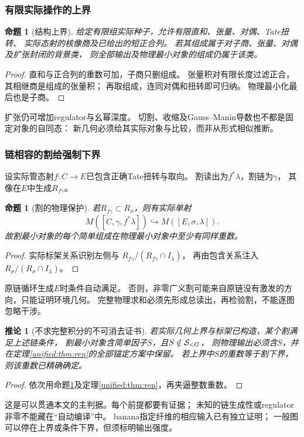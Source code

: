 \documentclass[11pt,a4paper,oneside]{ctexart}
\theoremstyle{cnplain}
\newtheorem{proposition}[theorem]{命题}
\newtheorem{corollary}[theorem]{推论}
\theoremstyle{definition}
\theoremstyle{remark}
\numberwithin{equation}{section}
\begin{document}
\subsubsection{有限实际操作的上界}
\begin{proposition}[结构上界]\label{unified:prop:upper}
给定有限组实际种子，允许有限直和、张量、对偶、Tate扭转、
实际态射的核像商及已给出的短正合列。
若其组成属于对子商、张量、对偶及扩张封闭的背景类，
则全部输出及物理最小对象的组成仍属于该类。
\end{proposition}
\begin{proof}
直和与正合列的重数可加，子商只删组成。
张量积对有限长度过滤正合，其相继商是组成的张量积；
再取组成，连同对偶和扭转即可归纳。
物理最小化最后也是子商。
\end{proof}
扩张仍可增加regulator与幺幂深度。
切割、收缩及Gauss--Manin导数也不都是固定对象的自同态：
新几何必须给其实际对象与比较，而非从形式相似推断。

\subsubsection{链相容的割给强制下界}
设实际管态射$f:C\to E$已包含正确Tate扭转与取向。
割读出为$f^*\lambda$，割链为$\gamma$，
其像在$E$中生成$R_{f\gamma}$。
\begin{proposition}[割的物理保护]\label{unified:prop:lower}
若$R_{f\gamma}\subset R_\sigma$，则有实际单射
\[
 M([C,\gamma,f^*\lambda])\hookrightarrow M([E,\sigma,\lambda]).
\]
故割最小对象的每个简单组成在物理最小对象中至少有同样重数。
\end{proposition}
\begin{proof}
实际标架关系识别左侧与
$R_{f\gamma}/(R_{f\gamma}\cap I_\lambda)$，
再由包含关系注入$R_\sigma/(R_\sigma\cap I_\lambda)$。
\end{proof}
原链循环生成$E$时条件自动满足。
否则，非零广义割可能来自原链没有激发的方向，只能证明环境几何。
完整物理求和必须先形成总读出，再检验割，不能逐图忽略干涉。

\begin{corollary}[不求完整积分的不可消去证书]\label{unified:cor:prediction}
若实际几何上界与标架已构造，某个割满足上述链条件，
割最小对象含简单因子$S$，且$S\notin\mathcal S_{<G}$，
则物理输出必须含$S$，并在定理\ref{unified:thm:ren}的全部锚定方案中保留。
若上界中$S$的重数等于割下界，则该重数已精确确定。
\end{corollary}
\begin{proof}
依次用命题\ref{unified:prop:lower}及定理\ref{unified:thm:ren}，再夹逼整数重数。
\end{proof}
这是可以贯通本文的主判据。每个前提都要有证据；
未知的链生成性或regulator非零不能藏在“自动编译”中。
banana指定纤维的相应输入已有独立证明；
一般图可以停在上界或条件下界，但须标明输出强度。
\end{document}
